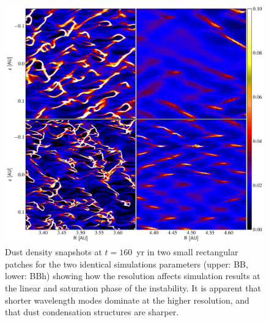 \begin{figure}
   \includegraphics[width=0.98\linewidth]{figures/fig10}
   \caption{Dust density snapshots at $t = 160$~yr in two small rectangular
      patches for the two identical simulations parameters (upper: BB, lower:
      BBh) showing how the resolution affects simulation results at the linear
      and saturation phase of the instability. It is apparent that shorter
      wavelength modes dominate at the higher resolution, and that dust
      condensation structures are sharper.
   } 
   \label{fig10} 
\end{figure}

